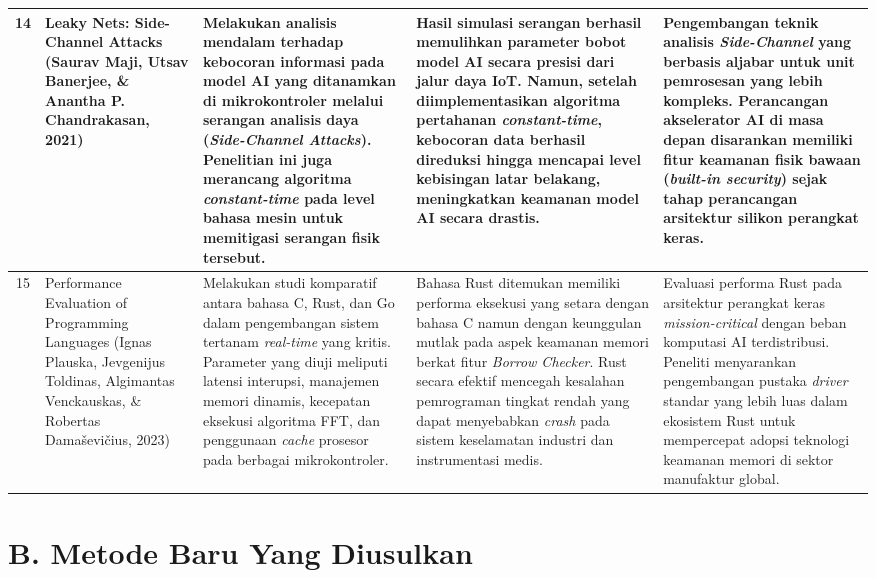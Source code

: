\documentclass[12pt,a4paper]{article}
\begin{document}
\begin{small}
\begin{longtable}{|c|>{\raggedright\arraybackslash}p{3cm}|>{\raggedright\arraybackslash}p{4cm}|>{\raggedright\arraybackslash}p{4cm}|>{\raggedright\arraybackslash}p{4cm}|}
14 & Leaky Nets: Side-Channel Attacks (Saurav Maji, Utsav Banerjee, \& Anantha P. Chandrakasan, 2021) & Melakukan analisis mendalam terhadap kebocoran informasi pada model AI yang ditanamkan di mikrokontroler melalui serangan analisis daya (\textit{Side-Channel Attacks}). Penelitian ini juga merancang algoritma \textit{constant-time} pada level bahasa mesin untuk memitigasi serangan fisik tersebut. & Hasil simulasi serangan berhasil memulihkan parameter bobot model AI secara presisi dari jalur daya IoT. Namun, setelah diimplementasikan algoritma pertahanan \textit{constant-time}, kebocoran data berhasil direduksi hingga mencapai level kebisingan latar belakang, meningkatkan keamanan model AI secara drastis. & Pengembangan teknik analisis \textit{Side-Channel} yang berbasis aljabar untuk unit pemrosesan yang lebih kompleks. Perancangan akselerator AI di masa depan disarankan memiliki fitur keamanan fisik bawaan (\textit{built-in security}) sejak tahap perancangan arsitektur silikon perangkat keras. \\ \hline

15 & Performance Evaluation of Programming Languages (Ignas Plauska, Jevgenijus Toldinas, Algimantas Venckauskas, \& Robertas Damaševičius, 2023) & Melakukan studi komparatif antara bahasa C, Rust, dan Go dalam pengembangan sistem tertanam \textit{real-time} yang kritis. Parameter yang diuji meliputi latensi interupsi, manajemen memori dinamis, kecepatan eksekusi algoritma FFT, dan penggunaan \textit{cache} prosesor pada berbagai mikrokontroler. & Bahasa Rust ditemukan memiliki performa eksekusi yang setara dengan bahasa C namun dengan keunggulan mutlak pada aspek keamanan memori berkat fitur \textit{Borrow Checker}. Rust secara efektif mencegah kesalahan pemrograman tingkat rendah yang dapat menyebabkan \textit{crash} pada sistem keselamatan industri dan instrumentasi medis. & Evaluasi performa Rust pada arsitektur perangkat keras \textit{mission-critical} dengan beban komputasi AI terdistribusi. Peneliti menyarankan pengembangan pustaka \textit{driver} standar yang lebih luas dalam ekosistem Rust untuk mempercepat adopsi teknologi keamanan memori di sektor manufaktur global. \\ \hline
\end{longtable}
\end{small}

\newpage
\section*{B. Metode Baru Yang Diusulkan}
\end{document}
